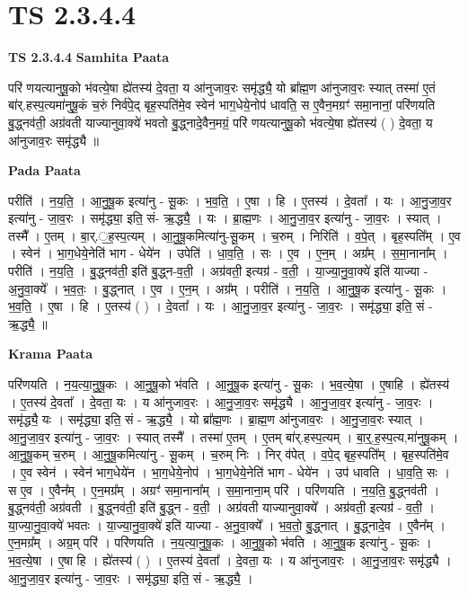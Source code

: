 \documentclass[17pt]{extarticle}
\begin{document}
\section{ TS 2.3.4.4 }

\textbf{TS 2.3.4.4 } \newline
\textbf{Samhita Paata} \newline

परि॑ णयत्यानुषू॒को भ॑वत्ये॒षा ह्ये॑तस्य॑ दे॒वता॒ य आ॑नुजाव॒रः समृ॑द्ध्यै॒ यो ब्रा᳚ह्म॒ण आ॑नुजाव॒रः स्यात् तस्मा॑ ए॒तं बा॑र्.हस्प॒त्यमा॑नुषू॒कं च॒रुं निर्व॑पे॒द् बृह॒स्पति॑मे॒व स्वेन॑ भाग॒धेये॒नोप॑ धावति॒ स ए॒वैन॒मग्रꣳ॑ समा॒नानां॒ परि॑णयति बु॒द्ध्नव॑ती॒ अग्र॑वती याज्यानुवा॒क्ये॑ भवतो बु॒द्ध्नादे॒वैन॒मग्रं॒ परि॑ णयत्यानुषू॒को भ॑वत्ये॒षा ह्ये॑तस्य॑ ( ) दे॒वता॒ य आ॑नुजाव॒रः समृ॑द्ध्यै ॥ \newline

\textbf{Pada Paata} \newline

परीति॑ । न॒य॒ति॒ । आ॒नु॒षू॒क इत्या॑नु - सू॒कः । भ॒व॒ति॒ । ए॒षा । हि । ए॒तस्य॑ । दे॒वता᳚ । यः । आ॒नु॒जा॒व॒र इत्या॑नु - जा॒व॒रः । समृ॑द्ध्या॒ इति॒ सं- ऋ॒द्ध्यै॒ । यः । ब्रा॒ह्म॒णः । आ॒नु॒जा॒व॒र इत्या॑नु - जा॒व॒रः । स्यात् । तस्मै᳚ । ए॒तम् । बा॒र्.॒ह॒स्प॒त्यम् । आ॒नु॒षू॒कमित्या॑नु-सू॒कम् । च॒रुम् । निरिति॑ । व॒पे॒त् । बृह॒स्पति᳚म् । ए॒व । स्वेन॑ । भा॒ग॒धेये॒नेति॑ भाग - धेये॑न । उपेति॑ । धा॒व॒ति॒ । सः । ए॒व । ए॒न॒म् । अग्र᳚म् । स॒मा॒नाना᳚म् । परीति॑ । न॒य॒ति॒ । बु॒द्ध्नव॑ती॒ इति॑ बु॒द्ध्न-व॒ती॒ । अग्र॑वती॒ इत्यग्र॑ - व॒ती॒ । या॒ज्या॒नु॒वा॒क्ये॑ इति॑ याज्या - अ॒नु॒वा॒क्ये᳚ । भ॒व॒तः॒ । बु॒द्ध्नात् । ए॒व । ए॒न॒म् । अग्र᳚म् । परीति॑ । न॒य॒ति॒ । आ॒नु॒षू॒क इत्या॑नु - सू॒कः । भ॒व॒ति॒ । ए॒षा । हि । ए॒तस्य॑ ( ) । दे॒वता᳚ । यः । आ॒नु॒जा॒व॒र इत्या॑नु - जा॒व॒रः । समृ॑द्ध्या॒ इति॒ सं - ऋ॒द्ध्यै॒ ॥  \newline


\textbf{Krama Paata} \newline

परि॑णयति । न॒य॒त्या॒नु॒षू॒कः । आ॒नु॒षू॒को भ॑वति । आ॒नु॒षू॒क इत्या॑नु - सू॒कः । भ॒व॒त्ये॒षा । ए॒षाहि । ह्ये॑तस्य॑ । ए॒तस्य॑ दे॒वता᳚ । दे॒वता॒ यः । य आ॑नुजाव॒रः । आ॒नु॒जा॒व॒रः समृ॑द्ध्यै । आ॒नु॒जा॒व॒र इत्या॑नु - जा॒व॒रः । समृ॑द्ध्यै॒ यः । समृ॑द्ध्या॒ इति॒ सं - ऋ॒द्ध्यै॒ । यो ब्रा᳚ह्म॒णः । ब्रा॒ह्म॒ण आ॑नुजाव॒रः । आ॒नु॒जा॒व॒रः स्यात् । आ॒नु॒जा॒व॒र इत्या॑नु - जा॒व॒रः । स्यात् तस्मै᳚ । तस्मा॑ ए॒तम् । ए॒तम् बा॑र्.हस्प॒त्यम् । बा॒र्॒.ह॒स्प॒त्य,मा॑नुषू॒कम् । आ॒नु॒षू॒कम् च॒रुम् । आ॒नु॒षू॒कमित्या॑नु - सू॒कम् । च॒रुम् निः । निर् व॑पेत् । व॒पे॒द् बृह॒स्पति᳚म् । बृह॒स्पति॑मे॒व । ए॒व स्वेन॑ । स्वेन॑ भाग॒धेये॑न । भा॒ग॒धेये॒नोप॑ । भा॒ग॒धेये॒नेति॑ भाग - धेये॑न । उप॑ धावति । धा॒व॒ति॒ सः । स ए॒व । ए॒वैन᳚म् । ए॒न॒मग्र᳚म् । अग्रꣳ॑ समा॒नाना᳚म् । स॒मा॒नाना॒म् परि॑ । परि॑णयति । न॒य॒ति॒ बु॒द्ध्नव॑ती । बु॒द्ध्नव॑ती॒ अग्र॑वती । बु॒द्ध्नव॑ती॒ इति॑ बु॒द्ध्न - व॒ती॒ । अग्र॑वती याज्यानुवा॒क्ये᳚ । अग्र॑वती॒ इत्यग्र॑ - व॒ती॒ । या॒ज्या॒नु॒वा॒क्ये॑ भवतः । या॒ज्या॒नु॒वा॒क्ये॑ इति॑ याज्या - अ॒नु॒वा॒क्ये᳚ । भ॒व॒तो॒ बु॒द्ध्नात् । बु॒द्ध्नादे॒व । ए॒वैन᳚म् । ए॒न॒मग्र᳚म् । अग्र॒म् परि॑ । परि॑णयति । न॒य॒त्या॒नु॒षू॒कः । आ॒नु॒षू॒को भ॑वति । आ॒नु॒षू॒क इत्या॑नु - सू॒कः । भ॒व॒त्ये॒षा । ए॒षा हि । ह्ये॑तस्य॑ ( ) । ए॒तस्य॑ दे॒वता᳚ । दे॒वता॒ यः । य आ॑नुजाव॒रः । आ॒नु॒जा॒व॒रः समृ॑द्ध्यै । आ॒नु॒जा॒व॒र इत्या॑नु - जा॒व॒रः । समृ॑द्ध्या॒ इति॒ सं - ऋ॒द्ध्यै॒ । \newline
\end{document}
